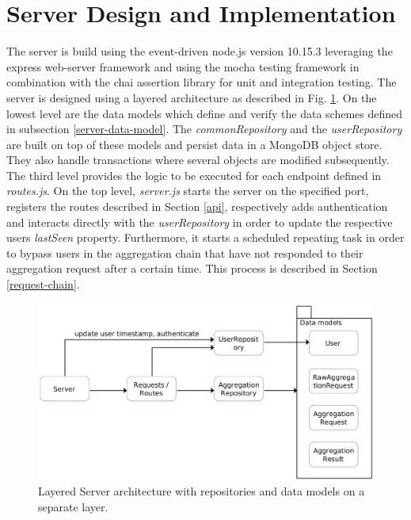 \section{Server Design and Implementation}\label{server}
The server is build using the event-driven node.js version 10.15.3 leveraging the express web-server framework \parencite{express} and using the mocha testing framework \parencite{mocha} in combination with the chai assertion library \parencite{chai} for unit and integration testing. The server is designed using a layered architecture as described in Fig. \ref{server-architecture}. On the lowest level are the data models which define and verify the data schemes defined in subsection \ref{server-data-model}. The \textit{commonRepository} and the \textit{userRepository} are built on top of these models and persist data in a MongoDB object store. They also handle transactions where several objects are modified subsequently. The third level provides the logic to be executed for each endpoint defined in \textit{routes.js}. On the top level, \textit{server.js} starts the server on the specified port, registers the routes described in Section \ref{api}, respectively adds authentication and interacts directly with the \textit{userRepository} in order to update the respective users \textit{lastSeen} property. Furthermore, it starts a scheduled repeating task in order to bypass users in the aggregation chain that have not responded to their aggregation request after a certain time. This process is described in Section \ref{request-chain}.

\begin{figure}[h!]
  \includegraphics[width=\textwidth]{data/diagrams/server-diagram.png}
  \caption{Layered Server architecture with repositories and data models on a separate layer.}
  \label{server-architecture}
\end{figure}

